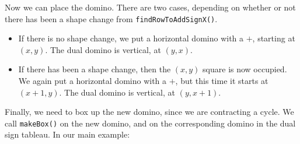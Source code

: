 \documentclass[12pt]{article}
\numberwithin{equation}{section}
\newcommand{\horizontalDominoMaybe}[3]{\filldraw [dominoMaybeStyle] (#2 - 1 + \eps, #1 - 1 + \eps) rectangle + (2 - \teps, 1 -\teps) node [dominoText] {$#3$};}
\newcommand{\horizontalDominoMaybeShift}[4]{\filldraw [dominoMaybeStyle] (#2 - 1 + #4 + \eps, #1 - 1 + \eps) rectangle + (2 - \teps, 1 -\teps) node [dominoText] {$#3$};}
\begin{document}
\begin{itemize}
    Now we can place the domino.
    There are two cases, depending on whether or not there has been a shape change from \linebreak \texttt{findRowToAddSignX()}.
    \begin{itemize}
      \item If there is no shape change, we put a horizontal domino with a $+$, starting at $(x, y)$.
      The dual domino is vertical, at $(y, x)$.
      \item  If there has been a shape change, then the $(x, y)$ square is now occupied.
      We again put a horizontal domino with a $+$, but this time it starts at $(x + 1, y)$.
      The dual domino is vertical, at $(y, x + 1)$.
    \end{itemize}

    Finally, we need to box up the new domino, since we are contracting a cycle.
    We call \texttt{makeBox()} on the new domino, and on the corresponding domino in the dual sign tableau.
    In our main example:
    \begin{figure}[H]
      \centering
    \end{figure}

    \begin{figure}[H]
      \centering
    \end{figure}


\end{itemize}
\end{document}
